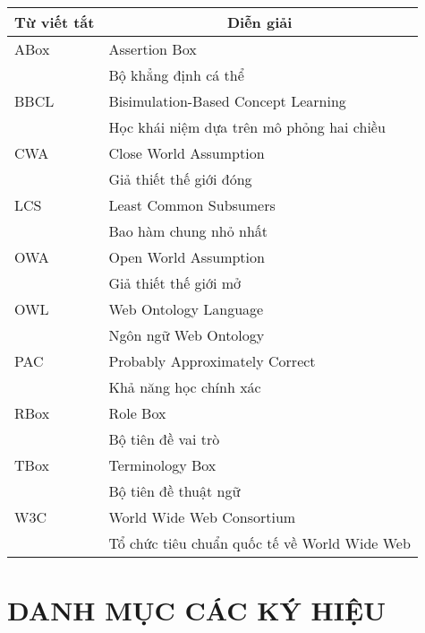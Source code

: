 \begin{tabular}{| p{2.5cm} | p{10.0cm} |}
	\hline
	\multicolumn{1}{|c|}{\bf Từ viết tắt} & \multicolumn{1}{c|}{\bf Diễn giải}\\
	\hline
	ABox & Assertion Box\\
	& Bộ khẳng định cá thể\\[1.0ex]
	BBCL & Bisimulation-Based Concept Learning\\
	& Học khái niệm dựa trên mô phỏng hai chiều\\[1.0ex]
	CWA  & Close World Assumption\\
	& Giả thiết thế giới đóng\\[1.0ex]
	LCS  & Least Common Subsumers\\
	& Bao hàm chung nhỏ nhất\\[1.0ex]
	OWA  & Open World Assumption\\
	& Giả thiết thế giới mở\\[1.0ex]
	OWL  & Web Ontology Language\\
	& Ngôn ngữ Web Ontology\\[1.0ex]
	PAC  & Probably Approximately Correct\\
	& Khả năng học chính xác\\[1.0ex]
	RBox & Role Box\\
	& Bộ tiên đề vai trò\\[1.0ex]
	TBox & Terminology Box\\
	& Bộ tiên đề thuật ngữ\\[1.0ex]
	W3C  & World Wide Web Consortium\\
	& Tổ chức tiêu chuẩn quốc tế về World Wide Web\\
	\hline
\end{tabular}
\cleardoublepage
\newpage
\chapter*{DANH MỤC CÁC KÝ HIỆU}
\thispagestyle{fancy}

